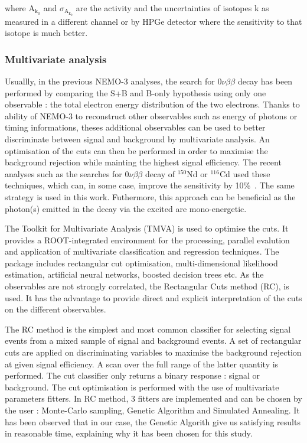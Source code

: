 \documentclass[main.tex]{subfiles}
\begin{document}
\bigskip


\NI where A$_{\text{k}_\text{0}}$ and $\sigma_{\text{A}_{\text{k}_\text{0}}}$ are the activity and the uncertainties of isotopes k as measured in a different channel or by HPGe detector where the sensitivity to that isotope is much better.


\subsubsection{Multivariate analysis}


\NI Usuallly, in the previous NEMO-3 analyses, the search for 0$\nu\beta\beta$ decay has been performed by comparing the S+B and B-only hypothesis using only one observable : the total electron energy distribution of the two electrons. Thanks to ability of NEMO-3 to reconstruct other observables such as energy of photons or timing informations, theses additional observables can be used to better discriminate between signal and background by multivariate analysis. An optimisation of the cuts can then be performed in order to maximise the background rejection while mainting the highest signal efficiency. The recent analyses such as the searches for 0$\nu\beta\beta$ decay of $^{\text{150}}$Nd or $^{\text{116}}$Cd used these techniques, which can, in some case, improve the sensitivity by 10\%~\cite{NEMO3:Nd150}. The same strategy is used in this work. Futhermore, this approach can be beneficial as the photon(s) emitted in the decay via the excited are mono-energetic.


\bigskip


\NI The Toolkit for Multivariate Analysis (TMVA) is used to optimise the cuts. It provides a ROOT-integrated environment for the processing, parallel evalution and application of multivariate classification and regression techniques. The package includes rectangular cut optimisation, multi-dimensional likelihood estimation, artificial neural networks, boosted decision trees etc. As the observables are not strongly correlated, the Rectangular Cuts method (RC), is used. It has the advantage to provide direct and explicit interpretation of the cuts on the different observables.


\bigskip


\NI The RC method is the simplest and most common classifier for selecting signal events from a mixed sample of signal and background events. A set of rectangular cuts are applied on discriminating variables to maximise the background rejection at given signal efficiency. A scan over the full range of the latter quantity is performed. The cut classifier only returns a binary response : signal or background. The cut optimisation is performed with the use of multivariate parameters fitters. In RC method, 3 fitters are implemented and can be chosen by the user : Monte-Carlo sampling, Genetic Algorithm and Simulated Annealing. It has been observed that in our case, the Genetic Algorith give us satisfying results in reasonable time, explaining why it has been chosen for this study.
\end{document}
